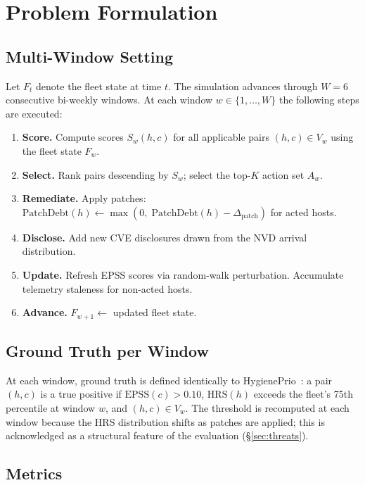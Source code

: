 \section{Problem Formulation}

\subsection{Multi-Window Setting}

Let $F_t$ denote the fleet state at time $t$. The simulation advances through $W = 6$ consecutive bi-weekly windows. At each window $w \in \{1, \ldots, W\}$ the following steps are executed:

\begin{enumerate}
\item \textbf{Score.} Compute scores $S_w(h, c)$ for all applicable pairs $(h, c) \in V_w$ using the fleet state $F_w$.
\item \textbf{Select.} Rank pairs descending by $S_w$; select the top-$K$ action set $A_w$.
\item \textbf{Remediate.} Apply patches: $\mathrm{PatchDebt}(h) \leftarrow \max(0,\; \mathrm{PatchDebt}(h) - \Delta_{\mathrm{patch}})$ for acted hosts.
\item \textbf{Disclose.} Add new CVE disclosures drawn from the NVD arrival distribution.
\item \textbf{Update.} Refresh EPSS scores via random-walk perturbation. Accumulate telemetry staleness for non-acted hosts.
\item \textbf{Advance.} $F_{w+1} \leftarrow$ updated fleet state.
\end{enumerate}

\subsection{Ground Truth per Window}

At each window, ground truth is defined identically to HygienePrio~\cite{paper4hygieneprio}: a pair $(h, c)$ is a true positive if $\mathrm{EPSS}(c) > 0.10$, $\mathrm{HRS}(h)$ exceeds the fleet's 75th percentile at window $w$, and $(h, c) \in V_w$. The threshold is recomputed at each window because the HRS distribution shifts as patches are applied; this is acknowledged as a structural feature of the evaluation (\S\ref{sec:threats}).

\subsection{Metrics}

